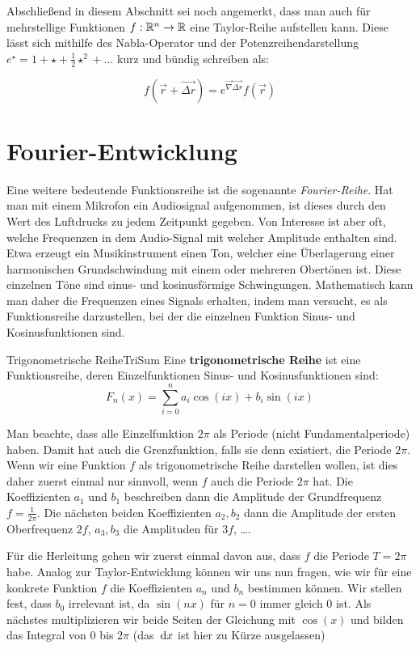 Abschließend in diesem Abschnitt sei noch angemerkt, dass man auch für mehrstellige Funktionen $f:\mathbb{R}^n\to \mathbb{R}$ eine Taylor-Reihe aufstellen kann. Diese lässt sich mithilfe des Nabla-Operator und der Potenzreihendarstellung $e^{\star} = 1 + \star + \frac{1}{2} \star^2 + \dots$ kurz und bündig schreiben als:

$$
    f(\vec{r}+\vec{\Delta r}) = e^{\vec{\nabla} \vec{\Delta r}} f(\vec{r})
$$

\section{Fourier-Entwicklung}

Eine weitere bedeutende Funktionsreihe ist die sogenannte \emph{Fourier-Reihe}. Hat man mit einem Mikrofon ein Audiosignal aufgenommen, ist dieses durch den Wert des Luftdrucks zu jedem Zeitpunkt gegeben. Von Interesse ist aber oft, welche Frequenzen in dem Audio-Signal mit welcher Amplitude enthalten sind. Etwa erzeugt ein Musikinstrument einen Ton, welcher eine Überlagerung einer harmonischen Grundschwindung mit einem oder mehreren Obertönen ist. Diese einzelnen Töne sind sinus- und kosinusförmige Schwingungen. Mathematisch kann man daher die Frequenzen eines Signals erhalten, indem man versucht, es als Funktionsreihe darzustellen, bei der die einzelnen Funktion Sinus- und Kosinusfunktionen sind.

\begin{definition}{Trigonometrische Reihe}{TriSum}
    Eine \textbf{trigonometrische Reihe} ist eine Funktionsreihe, deren Einzelfunktionen Sinus- und Kosinusfunktionen sind:
    $$
        F_n(x) = \sum\limits_{i=0}^n a_i \cos(ix) + b_i \sin(ix)
    $$
\end{definition}

Man beachte, dass alle Einzelfunktion $2\pi$ als Periode (nicht Fundamentalperiode) haben. Damit hat auch die Grenzfunktion, falls sie denn existiert, die Periode $2\pi$. Wenn wir eine Funktion $f$ als trigonometrische Reihe darstellen wollen, ist dies daher zuerst einmal nur sinnvoll, wenn $f$ auch die Periode $2\pi$ hat. Die Koeffizienten $a_1$ und $b_1$ beschreiben dann die Amplitude der Grundfrequenz $f=\frac{1}{2\pi}$. Die nächsten beiden Koeffizienten $a_2, b_2$ dann die Amplitude der ersten Oberfrequenz $2f$, $a_3, b_3$ die Amplituden für $3f$, \dots.

Für die Herleitung gehen wir zuerst einmal davon aus, dass $f$ die Periode $T=2\pi$ habe. Analog zur Taylor-Entwicklung können wir uns nun fragen, wie wir für eine konkrete Funktion $f$ die Koeffizienten $a_n$ und $b_n$ bestimmen können. Wir stellen fest, dass $b_0$ irrelevant ist, da $\sin(nx)$ für $n=0$ immer gleich $0$ ist. Als nächstes multiplizieren wir beide Seiten der Gleichung mit $\cos(x)$ und bilden das Integral von $0$ bis $2\pi$ (das $\:\mathrm{d}{x}$ ist hier zu Kürze ausgelassen)


